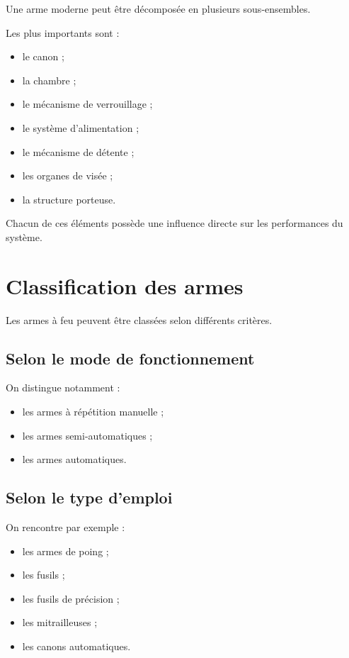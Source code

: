 Une arme moderne peut être décomposée en plusieurs sous-ensembles.

Les plus importants sont :

\begin{itemize}
    \item le canon ;
    \item la chambre ;
    \item le mécanisme de verrouillage ;
    \item le système d'alimentation ;
    \item le mécanisme de détente ;
    \item les organes de visée ;
    \item la structure porteuse.
\end{itemize}

Chacun de ces éléments possède une influence directe sur les performances
du système.

\section{Classification des armes}

Les armes à feu peuvent être classées selon différents critères.

\subsection{Selon le mode de fonctionnement}

On distingue notamment :

\begin{itemize}
    \item les armes à répétition manuelle ;
    \item les armes semi-automatiques ;
    \item les armes automatiques.
\end{itemize}

\subsection{Selon le type d'emploi}

On rencontre par exemple :

\begin{itemize}
    \item les armes de poing ;
    \item les fusils ;
    \item les fusils de précision ;
    \item les mitrailleuses ;
    \item les canons automatiques.
\end{itemize}

